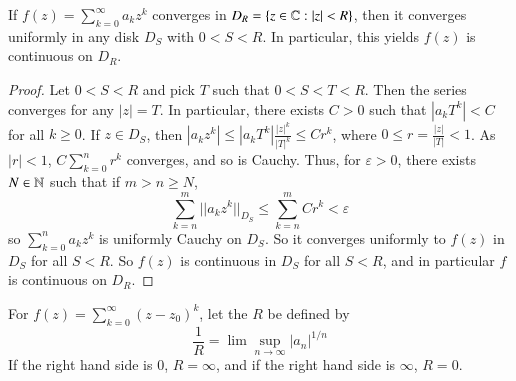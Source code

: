 \begin{proposition}\label{prop:3.3.2}
    If $f(z) = \sum_{k=0}^{\infty}a_kz^k$ converges in $D_R = \{z \in \mathbb C:|z| < R\}$, then it converges uniformly in any disk $D_S$ with $0 < S < R$. In particular, this yields $f(z)$ is continuous on $D_R$.
\end{proposition}
\begin{proof}
    Let $0 < S < R$ and pick $T$ such that $0 < S < T<R$. Then the series converges for any $|z| = T$. In particular, there exists $C > 0$ such that $|a_kT^k| < C$ for all $k \geq 0$. If $z \in D_S$, then $|a_kz^k| \leq |a_kT^k|\frac{|z|^k}{|T|^k} \leq Cr^k$, where $0 \leq r = \frac{|z|}{|T|} < 1$. As $|r| < 1$, $C\sum_{k=0}^nr^k$ converges, and so is Cauchy. Thus, for $\varepsilon > 0$, there exists $N \in \mathbb N$ such that if $m > n \geq N$, \begin{equation*}
        \sum_{k=n}^m||a_kz^k||_{D_S} \leq \sum_{k=n}^mCr^k < \varepsilon
    \end{equation*}
    so $\sum_{k=0}^na_kz^k$ is uniformly Cauchy on $D_S$. So it converges uniformly to $f(z)$ in $D_S$ for all $S < R$. So $f(z)$ is continuous in $D_S$ for all $S < R$, and in particular $f$ is continuous on $D_R$.
\end{proof}

\begin{definition}
    For $f(z) = \sum_{k=0}^{\infty}(z-z_0)^k$, let the  $R$ be defined by \begin{equation*}
        \frac{1}{R} = \lim\sup_{n\rightarrow \infty}|a_n|^{1/n}
    \end{equation*}
    If the right hand side is $0$, $R = \infty$, and if the right hand side is $\infty$, $R = 0$.
\end{definition}

